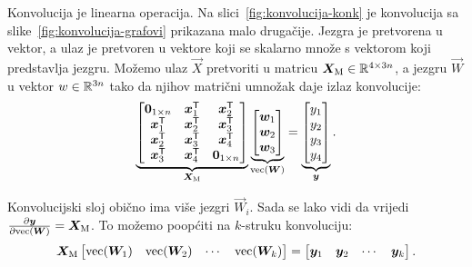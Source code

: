 \documentclass[utf8, diplomski, lmodern]{fer}
\begin{document}
Konvolucija je linearna operacija. Na slici~\ref{fig:konvolucija-konk} je konvolucija sa slike~\ref{fig:konvolucija-grafovi} prikazana malo drugačije. Jezgra je pretvorena u vektor, a ulaz je pretvoren u vektore koji se skalarno množe s vektorom koji predstavlja jezgru. Možemo ulaz $\vec X$ pretvoriti u matricu $\vec X_\text{M}\in\R^{4\times 3n}$, a jezgru $\vec W$ u vektor $w\in\mathbb{R}^{3n}$ tako da njihov matrični umnožak daje izlaz konvolucije:
\begin{align}
\underbrace{
\begin{bmatrix}
\cvec 0_{1\times n} & \vec x_1^\tp & \vec x_2^\tp \\
       \vec x_1^\tp & \vec x_2^\tp & \vec x_3^\tp \\
       \vec x_2^\tp & \vec x_3^\tp & \vec x_4^\tp \\
       \vec x_3^\tp & \vec x_4^\tp & \cvec 0_{1\times n}         
\end{bmatrix}
}_{\vec X_{\text{M}}}
\underbrace{
\begin{bmatrix}
\vec w_1 \\
\vec w_2 \\
\vec w_3     
\end{bmatrix}
}_{\vecfunc(\vec W)}
=
\underbrace{
\begin{bmatrix}
y_1 \\ y_2 \\ y_3 \\y_4     
\end{bmatrix}
}_{\vec y}
\text{.}
\end{align}

Konvolucijski sloj obično ima više jezgri $\vec W_i$. Sada se lako vidi da vrijedi $\pd{\vec y}{\vecfunc(\vec W)}=\vec X_\text{M}$. To možemo poopćiti na $k$-struku konvoluciju:
\begin{align} \label{eq:konvolucija-matrica-tezina}
\vec X_\text{M}
\begin{bmatrix}
\vecfunc(\vec W_1) & \vecfunc(\vec W_2) & \cdots & \vecfunc(\vec W_k)
\end{bmatrix}
= 
\begin{bmatrix}
\vec y_1 & \vec y_2 & \cdots & \vec y_k \\
\end{bmatrix}
\text{.}
\end{align}
\end{document}
